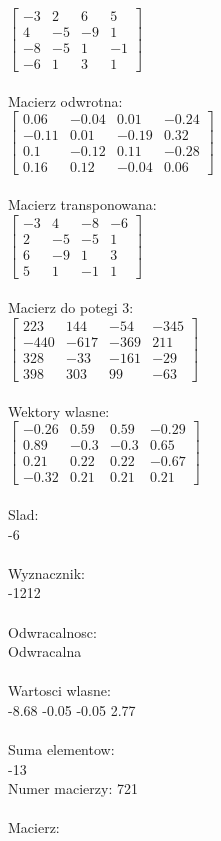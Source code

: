 \documentclass[a4paper,12pt]{article}
\begin{document}
$\begin{bmatrix} -3&2&6&5\\4&-5&-9&1\\-8&-5&1&-1\\-6&1&3&1 \end{bmatrix}$
\\
\\
Macierz odwrotna:\\

$\begin{bmatrix} 0.06&-0.04&0.01&-0.24\\-0.11&0.01&-0.19&0.32\\0.1&-0.12&0.11&-0.28\\0.16&0.12&-0.04&0.06 \end{bmatrix}$
\\
\\
Macierz transponowana:\\

$\begin{bmatrix} -3&4&-8&-6\\2&-5&-5&1\\6&-9&1&3\\5&1&-1&1 \end{bmatrix}$
\\
\\
Macierz do potegi 3:\\

$\begin{bmatrix} 223&144&-54&-345\\-440&-617&-369&211\\328&-33&-161&-29\\398&303&99&-63 \end{bmatrix}$
\\
\\
Wektory wlasne:\\

$\begin{bmatrix} -0.26&0.59&0.59&-0.29\\0.89&-0.3&-0.3&0.65\\0.21&0.22&0.22&-0.67\\-0.32&0.21&0.21&0.21 \end{bmatrix}$
\\
\\
Slad:\\
-6
\\
\\
Wyznacznik:\\
-1212
\\
\\
Odwracalnosc:\\
Odwracalna
\\
\\
Wartosci wlasne:\\
-8.68 -0.05 -0.05 2.77
\\
\\
Suma elementow:\\
-13
\\
\newpage
Numer macierzy:
721
\\
\\
Macierz:\\
\end{document}

